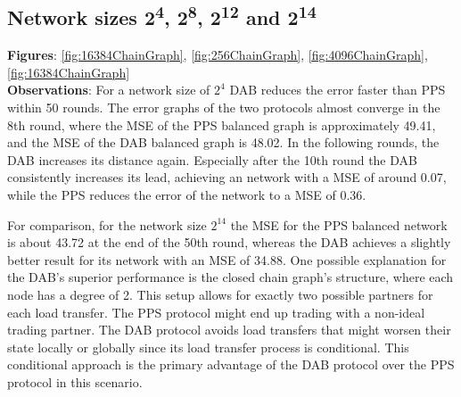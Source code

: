 \subsection{Network sizes 2\textsuperscript{4}, 2\textsuperscript{8}, 2\textsuperscript{12} and 2\textsuperscript{14}}
\textbf{Figures}: \ref{fig:16384ChainGraph}, \ref{fig:256ChainGraph}, \ref{fig:4096ChainGraph}, \ref{fig:16384ChainGraph}\\
\textbf{Observations}: For a network size of $2^{4}$ DAB reduces the error faster than PPS within 50 rounds. The error graphs of the two protocols almost converge in the 8th round, where the MSE of the PPS balanced graph is approximately 49.41, and the MSE of the DAB balanced graph is 48.02. In the following rounds, the DAB increases its distance again. Especially after the 10th round the DAB consistently increases its lead, achieving an network with a MSE of around 0.07, while the PPS reduces the error of the network to a MSE of 0.36.

For comparison, for the network size $2^{14}$ the MSE for the PPS balanced network is about 43.72 at the end of the 50th round, whereas the DAB achieves a slightly better result for its network with an MSE of 34.88. One possible explanation for the DAB’s superior performance is the closed chain graph's structure, where each node has a degree of 2. This setup allows for exactly two possible partners for each load transfer. The PPS protocol might end up trading with a non-ideal trading partner. The DAB protocol avoids load transfers that might worsen their state locally or globally since its load transfer process is conditional. This conditional approach is the primary advantage of the DAB protocol over the PPS protocol in this scenario.\\

